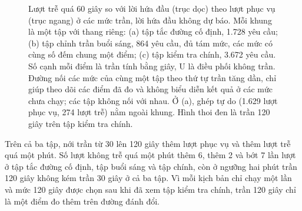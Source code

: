 \begin{figure}[htbp]
\caption{Lượt trễ quá 60 giây so với lời hứa đầu (trục dọc) theo lượt phục vụ (trục ngang) ở các mức
trần, lời hứa đầu không dự báo. Mỗi khung là một tập với thang riêng: (a) tập tắc đường cố định, 1.728
yêu cầu; (b) tập chỉnh trần buổi sáng, 864 yêu cầu, đủ tám mức, các mức có cùng số đếm chung một điểm; (c) tập
kiểm tra chính, 3.672 yêu cầu. Số cạnh mỗi điểm là trần tính bằng giây, U là điều phối không trần. Đường nối các mức
của cùng một tập theo thứ tự trần tăng dần, chỉ giúp theo dõi các điểm đã đo và không biểu diễn kết quả ở các mức
chưa chạy; các tập không nối với nhau. Ở (a), ghép tự do (1.629 lượt phục vụ, 274 lượt trễ) nằm ngoài khung. Hình
thoi đen là trần 120 giây trên tập kiểm tra chính.}
\label{hinh:c4-tran}
\end{figure}

Trên cả ba tập, nới trần từ 30 lên 120 giây thêm lượt phục vụ và thêm lượt trễ quá một phút. Số lượt không trễ quá một
phút thêm 6, thêm 2 và bớt 7 lần lượt ở tập tắc đường cố định, tập buổi sáng và tập chính, còn ở ngưỡng hai phút trần
120 giây không kém trần 30 giây ở cả ba tập. Vì mỗi kịch bản chỉ chạy một lần và mức 120 giây được chọn sau khi đã xem
tập kiểm tra chính, trần 120 giây chỉ là một điểm đo thêm trên đường đánh đổi.

